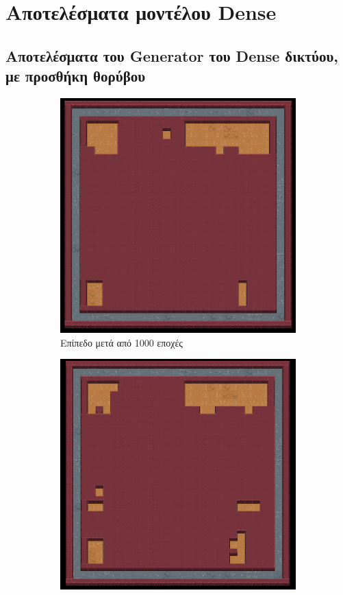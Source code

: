 \section{Αποτελέσματα μοντέλου Dense}

\subsection{Αποτελέσματα του Generator του Dense δικτύου, με προσθήκη θορύβου}
\begin{figure}[H]
\begin{subfigure}{.5\textwidth}
  \centering
  \includegraphics[width=.8\linewidth]{../images/result_images/dense-gan-with-fuzzy/generator_1000.png}
  \caption{Επίπεδο μετά από 1000 εποχές}
  \label{fig:sfig1}
\end{subfigure}%
\begin{subfigure}{.5\textwidth}
  \centering
  \includegraphics[width=.8\linewidth]{../images/result_images/dense-gan-with-fuzzy/generator_3000.png}

\end{subfigure}
\end{figure}
